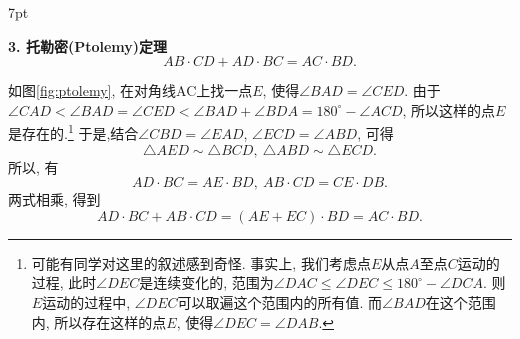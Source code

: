 \documentclass{book}
\newenvironment{theorem}{%
\def\FrameCommand{%
\hspace{1pt}%
{\color{cyan!60!blue}\vrule width 2pt}%
{\color{cyan!10}\vrule width 4pt}%
\colorbox{cyan!10}%
}%
\MakeFramed{\advance\hsize-\width\FrameRestore}%
\noindent\hspace{-4.55pt}%
\begin{adjustwidth}{}{7pt}%
\vspace{2pt}\vspace{2pt}%
}
{%
\vspace{2pt}\end{adjustwidth}\endMakeFramed%
}
\begin{document}
\begin{paracol}{2}
\switchcolumn*
\begin{theorem}
	\textbf{3. 托勒密(Ptolemy)定理}
	\[AB\cdot CD+AD\cdot BC=AC\cdot BD.\]
\end{theorem}
\par
如图\ref{fig:ptolemy}, 在对角线AC上找一点$E$, 使得$\angle BAD=\angle CED$. 由于$\angle CAD<\angle BAD=\angle CED<\angle BAD+\angle BDA=180^\circ -\angle ACD$,
所以这样的点$E$是存在的.\footnote{可能有同学对这里的叙述感到奇怪. 事实上, 我们考虑点$E$从点$A$至点$C$运动的过程, 此时$\angle DEC$是连续变化的, 范围为$\angle DAC\le\angle DEC\le 180^\circ-\angle DCA$. 则$E$运动的过程中, $\angle DEC$可以取遍这个范围内的所有值. 而$\angle BAD$在这个范围内, 所以存在这样的点$E$, 使得$\angle DEC=\angle DAB$.} 于是,结合$\angle CBD=\angle EAD$, $\angle ECD=\angle ABD$, 可得
\[\triangle AED\sim\triangle BCD,\ \triangle ABD\sim\triangle ECD.\]
所以, 有
\[AD\cdot BC=AE\cdot BD,\ AB\cdot CD=CE\cdot DB.\]
两式相乘, 得到
\[AD\cdot BC+AB\cdot CD=(AE+EC)\cdot BD=AC\cdot BD.\]


\end{paracol}
\end{document}
